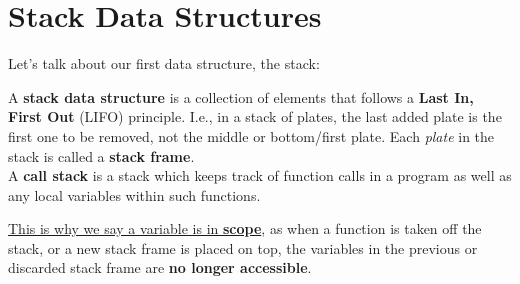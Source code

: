 
\newpage 

\section{Stack Data Structures}
\label{sec:stacks_heaps}

\noindent
Let's talk about our first data structure, the stack:
\begin{Def}[Stack]

    A \textbf{stack data structure} is a collection of elements that follows a \textbf{Last In, First Out} (LIFO) principle. I.e., in a 
    stack of plates, the last added plate is the first one to be removed, not the middle or bottom/first plate.
    Each \textit{plate} in the stack is called a \textbf{stack frame}.\\

    \noindent
    A \textbf{call stack} is a stack which keeps track of function calls in a program as well as any local variables within such functions.
    
    \underline{This is why we say a variable is in \textbf{scope}}, as when a function is taken off the stack, or a new stack frame 
    is placed on top, the variables in the previous or discarded stack frame are \textbf{no longer accessible}.
\end{Def}

\vspace{-1.5em}


